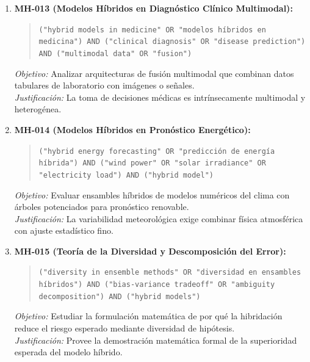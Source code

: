 \begin{enumerate}
  \textit{Justificación:} Cumple con requerimientos de Basilea manteniendo explicabilidad y elevando la precisión.
  \item \textbf{MH-013 (Modelos Híbridos en Diagnóstico Clínico Multimodal):}
  \begin{quote}
  \texttt{("hybrid models in medicine" OR "modelos híbridos en medicina") AND ("clinical diagnosis" OR "disease prediction") AND ("multimodal data" OR "fusion")}
  \end{quote}
  \textit{Objetivo:} Analizar arquitecturas de fusión multimodal que combinan datos tabulares de laboratorio con imágenes o señales.\\
  \textit{Justificación:} La toma de decisiones médicas es intrínsecamente multimodal y heterogénea.
  \item \textbf{MH-014 (Modelos Híbridos en Pronóstico Energético):}
  \begin{quote}
  \texttt{("hybrid energy forecasting" OR "predicción de energía híbrida") AND ("wind power" OR "solar irradiance" OR "electricity load") AND ("hybrid model")}
  \end{quote}
  \textit{Objetivo:} Evaluar ensambles híbridos de modelos numéricos del clima con árboles potenciados para pronóstico renovable.\\
  \textit{Justificación:} La variabilidad meteorológica exige combinar física atmosférica con ajuste estadístico fino.
  \item \textbf{MH-015 (Teoría de la Diversidad y Descomposición del Error):}
  \begin{quote}
  \texttt{("diversity in ensemble methods" OR "diversidad en ensambles híbridos") AND ("bias-variance tradeoff" OR "ambiguity decomposition") AND ("hybrid models")}
  \end{quote}
  \textit{Objetivo:} Estudiar la formulación matemática de por qué la hibridación reduce el riesgo esperado mediante diversidad de hipótesis.\\
  \textit{Justificación:} Provee la demostración matemática formal de la superioridad esperada del modelo híbrido.
\end{enumerate}


